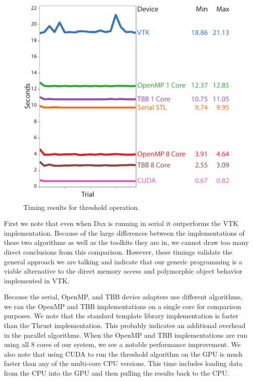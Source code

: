\documentclass[conference]{IEEEtran}
\begin{document}
\begin{figure}[htb]
  \centering
  \includegraphics{images/ThresholdTiming}
  \caption{Timing results for threshold operation.}
  \label{fig:Timing}
\end{figure}

First we note that even when Dax is running in serial it outperforms the
VTK implementation.  Because of the large differences between the
implementations of these two algorithms as well as the toolkits they are
in, we cannot draw too many direct conclusions from this comparison.
However, these timings validate the general approach we are talking and
indicate that our generic programming is a viable alternative to the direct
memory access and polymorphic object behavior implemented in VTK.

Because the serial, OpenMP, and TBB device adapters use different
algorithms, we ran the OpenMP and TBB implementations on a single core for
comparison purposes.  We note that the standard template library
implementation is faster than the Thrust implementation.  This probably
indicates an additional overhead in the parallel algorithms.  When the
OpenMP and TBB implementations are run using all 8 cores of our system, we
see a notable performance improvement.  We also note that using CUDA to run
the threshold algorithm on the GPU is much faster than any of the
multi-core CPU versions.  This time includes loading data from the CPU into
the GPU and then pulling the results back to the CPU.
\end{document}
